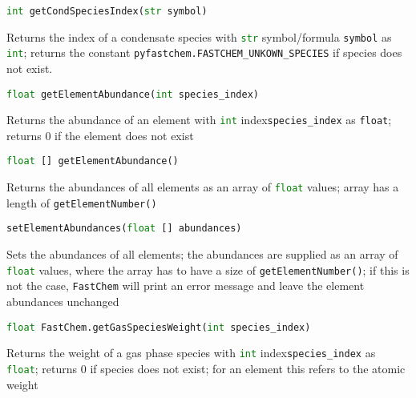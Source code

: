 \documentclass[numbers=noenddot]{aux/fcmanual}
\newcommand{\fc}{\texttt{FastChem}\xspace}
\begin{document}
\lstinline[language=Python]!int getCondSpeciesIndex(str symbol)!
\begin{addmargin}[25pt]{0pt}
	Returns the index of a condensate species with \lstinline[language=Python]!str! symbol/formula \lstinline!symbol! as \lstinline[language=Python]!int!; returns the constant \lstinline!pyfastchem.FASTCHEM_UNKOWN_SPECIES! if species does not exist.
\end{addmargin}

\bigbreak

\lstinline[language=Python]!float getElementAbundance(int species_index)!
\begin{addmargin}[25pt]{0pt}
	Returns the abundance of an element with \lstinline[language=Python]!int! index\footnotemark[\value{footnote}] \lstinline!species_index! as \lstinline!float!; returns 0 if the element does not exist
\end{addmargin}


\bigbreak

\lstinline[language=Python]!float [] getElementAbundance()!
\begin{addmargin}[25pt]{0pt}
	Returns the abundances of all elements as an array of \lstinline[language=Python]!float! values; array has a length of \lstinline!getElementNumber()!
\end{addmargin}

\bigbreak

\lstinline[language=Python]!setElementAbundances(float [] abundances)!
\begin{addmargin}[25pt]{0pt}
	Sets the abundances of all elements; the abundances are supplied as an array of \lstinline[language=Python]!float! values, where the array has to have a size of \lstinline[language=Python]!getElementNumber()!; if this is not the case, \fc will print an error message and leave the element abundances unchanged
\end{addmargin}

\bigbreak

\lstinline[language=Python]!float FastChem.getGasSpeciesWeight(int species_index)!
\begin{addmargin}[25pt]{0pt}
	Returns the weight of a gas phase species with \lstinline[language=Python]!int! index\footnotemark[\value{footnote}] \lstinline!species_index! as \lstinline[language=Python]!float!; returns 0 if species does not exist; for an element this refers to the atomic weight
\end{addmargin}

\bigbreak
\end{document}

